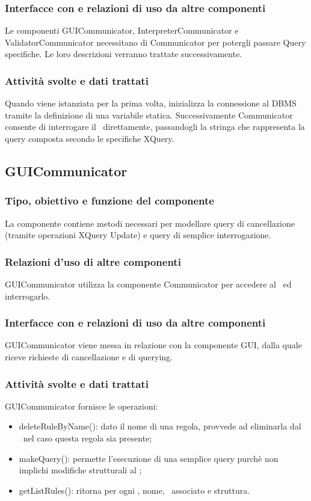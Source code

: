 \documentclass[11pt,titlepage,a4paper]{report}
\begin{document}
\subsubsection{Interfacce con e relazioni di uso da altre componenti}
Le componenti GUICommunicator, InterpreterCommunicator e ValidatorCommunicator necessitano di Communicator per potergli passare Query specifiche. Le loro descrizioni verranno trattate successivamente.
\subsubsection{Attivit\`a svolte e dati trattati}
Quando viene istanziata per la prima volta, inizializza la connessione al DBMS tramite la definizione di una variabile statica. Successivamente Communicator consente di interrogare il \re\ direttamente, passandogli la stringa che rappresenta la query composta secondo le specifiche XQuery.
%
\subsection{GUICommunicator}
\subsubsection{Tipo, obiettivo e funzione del componente}
La componente contiene metodi necessari per modellare query di cancellazione (tramite operazioni XQuery Update) e query di semplice interrogazione.
\subsubsection{Relazioni d'uso di altre componenti}
GUICommunicator utilizza la componente Communicator per accedere al \re\ ed interrogarlo.
\subsubsection{Interfacce con e relazioni di uso da altre componenti}
GUICommunicator viene messa in relazione con la componente GUI, dalla quale riceve richieste di cancellazione e di querying.
\subsubsection{Attivit\`a svolte e dati trattati}
GUICommunicator fornisce le operazioni:
\begin{itemize}
 \item deleteRuleByName(): dato il nome di una regola, provvede ad eliminarla dal \re\ nel caso questa regola sia presente;
 \item makeQuery(): permette l'esecuzione di una semplice query purch\`e non implichi modifiche strutturali al \re;
 \item getListRules(): ritorna per ogni \br, nome, \bo\ associato e struttura.
\end{itemize}
\end{document}
